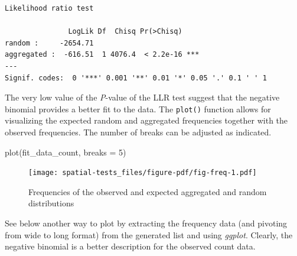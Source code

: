 \documentclass[
  letterpaper,
]{book}
\newenvironment{Shaded}{\begin{snugshade}}{\end{snugshade}}
\newcommand{\AttributeTok}[1]{\textcolor[rgb]{0.40,0.45,0.13}{#1}}
\newcommand{\DecValTok}[1]{\textcolor[rgb]{0.68,0.00,0.00}{#1}}
\newcommand{\FunctionTok}[1]{\textcolor[rgb]{0.28,0.35,0.67}{#1}}
\newcommand{\NormalTok}[1]{\textcolor[rgb]{0.00,0.23,0.31}{#1}}
\newcommand{\SpecialCharTok}[1]{\textcolor[rgb]{0.37,0.37,0.37}{#1}}
\begin{document}
\begin{Shaded}
\end{Shaded}

\begin{verbatim}
Likelihood ratio test

               LogLik Df  Chisq Pr(>Chisq)    
random :     -2654.71                         
aggregated :  -616.51  1 4076.4  < 2.2e-16 ***
---
Signif. codes:  0 '***' 0.001 '**' 0.01 '*' 0.05 '.' 0.1 ' ' 1
\end{verbatim}

The very low value of the \emph{P}-value of the LLR test suggest that
the negative binomial provides a better fit to the data. The
\texttt{plot()} function allows for visualizing the expected random and
aggregated frequencies together with the observed frequencies. The
number of breaks can be adjusted as indicated.

\begin{Shaded}
\begin{Highlighting}[]
\FunctionTok{plot}\NormalTok{(fit\_data\_count, }\AttributeTok{breaks =} \DecValTok{5}\NormalTok{) }
\end{Highlighting}
\end{Shaded}

\begin{figure}[H]

{\centering \texttt{[image: spatial-tests\_files/figure-pdf/fig-freq-1.pdf]}

}

\caption{\label{fig-freq}Frequencies of the observed and expected
aggregated and random distributions}

\end{figure}

See below another way to plot by extracting the frequency data (and
pivoting from wide to long format) from the generated list and using
\emph{ggplot}. Clearly, the negative binomial is a better description
for the observed count data.
\end{document}
